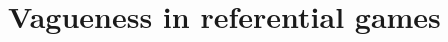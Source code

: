 \documentclass[a4paper]{article}
\begin{document}
\section{Vagueness in referential games}
\label{sec:referential-vagueness}

%
%
\end{document}
